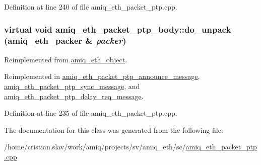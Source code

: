 Definition at line 240 of file amiq\_\-eth\_\-packet\_\-ptp.cpp.\hypertarget{classamiq__eth__packet__ptp__body_a17a10ad537b6553f35b54d2f037d4f0d}{
\subsubsection[{do\_\-unpack}]{\setlength{\rightskip}{0pt plus 5cm}virtual void amiq\_\-eth\_\-packet\_\-ptp\_\-body::do\_\-unpack ({\bf amiq\_\-eth\_\-packer} \& {\em packer})}}
\label{classamiq__eth__packet__ptp__body_a17a10ad537b6553f35b54d2f037d4f0d}


Reimplemented from \hyperlink{classamiq__eth__object_aaa82659e656422df7dcf2cce578fc7d7}{amiq\_\-eth\_\-object}.

Reimplemented in \hyperlink{classamiq__eth__packet__ptp__announce__message_ad5f6e496679c3ba130275b5330a23366}{amiq\_\-eth\_\-packet\_\-ptp\_\-announce\_\-message}, \hyperlink{classamiq__eth__packet__ptp__sync__message_ad0756fb94c7d9ea5ea0da34ca6b41a53}{amiq\_\-eth\_\-packet\_\-ptp\_\-sync\_\-message}, and \hyperlink{classamiq__eth__packet__ptp__delay__req__message_aadf94c8b12005e5bdcbc01e5ca8adef6}{amiq\_\-eth\_\-packet\_\-ptp\_\-delay\_\-req\_\-message}.

Definition at line 235 of file amiq\_\-eth\_\-packet\_\-ptp.cpp.

The documentation for this class was generated from the following file:\begin{DoxyCompactItemize}
\item 
/home/cristian.slav/work/amiq/projects/sv/amiq\_\-eth/sc/\hyperlink{amiq__eth__packet__ptp_8cpp}{amiq\_\-eth\_\-packet\_\-ptp.cpp}\end{DoxyCompactItemize}
